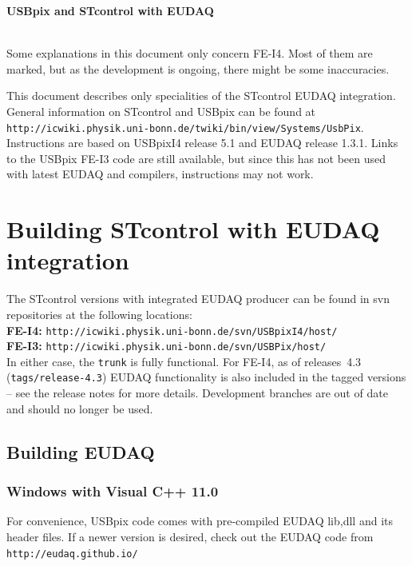 \documentclass[a4paper,12pt]{article}
\begin{document}
\centerline{\bf\LARGE USBpix and STcontrol with EUDAQ}\ \\[5mm]

Some explanations in this document only concern FE-I4. Most of them are marked,
but as the development is ongoing, there might be some inaccuracies.

This document describes only specialities of the STcontrol EUDAQ integration. 
General information on STcontrol and USBpix can be found at \\
{\tt http://icwiki.physik.uni-bonn.de/twiki/bin/view/Systems/UsbPix}.\\
Instructions are based on USBpixI4 release 5.1 and EUDAQ release 1.3.1. Links to 
the USBpix FE-I3 code are still available, but since this has not been used
with latest EUDAQ and compilers, instructions may not work.

\section{Building STcontrol with EUDAQ integration}

The STcontrol versions with integrated EUDAQ producer can be found in 
svn repositories at the following locations:\\
{\bf FE-I4:} {\tt http://icwiki.physik.uni-bonn.de/svn/USBpixI4/host/}\\
{\bf FE-I3:} {\tt http://icwiki.physik.uni-bonn.de/svn/USBPix/host/}\\
In either case, the {\tt trunk} is fully functional. For FE-I4, as of releases~4.3
 ({\tt tags/release-4.3}) EUDAQ functionality is also included in the 
tagged versions -- see the
release notes for more details. Development branches are out of date 
and should no longer be used.

\subsection{Building EUDAQ}

\subsubsection{Windows with Visual C++ 11.0}

For convenience, USBpix code comes with pre-compiled EUDAQ lib,dll and 
its header files. If a newer version is desired, check out the EUDAQ
code from \\
{\tt http://eudaq.github.io/} \\
\end{document}
